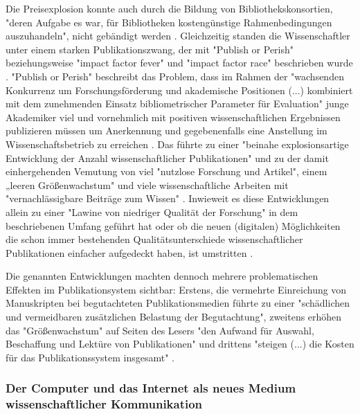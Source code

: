 Die Preisexplosion konnte auch durch die Bildung von Bibliothekskonsortien, "deren Aufgabe es war, für Bibliotheken kostengünstige Rahmenbedingungen auszuhandeln", nicht gebändigt werden \cite{Fladung_2003} \cite{Brintzinger_2010}. Gleichzeitig standen die Wissenschaftler unter einem starken Publikationszwang, der mit "Publish or Perish" \cite{CLAPHAM_2005} beziehungsweise "impact factor fever" \cite{Cherubini_2008} und "impact factor race" \cite{Brischoux_2009} beschrieben wurde \cite{offhaus_2012_institutionelle_repos}. "Publish or Perish" beschreibt das Problem, dass im Rahmen der "wachsenden Konkurrenz um Forschungsförderung und akademische Positionen (...) kombiniert mit dem zunehmenden Einsatz bibliometrischer Parameter für Evaluation" \cite{Fanelli_2010} junge Akademiker viel und vornehmlich mit positiven wissenschaftlichen Ergebnissen publizieren müssen um Anerkennung und gegebenenfalls eine Anstellung im Wissenschaftsbetrieb zu erreichen \cite{pscheida_2010_wikipedia} \cite{Beasley_2005} \cite{hamilton_1990_publishing}. Das führte zu einer "beinahe explosionsartige Entwicklung der Anzahl wissenschaftlicher Publikationen" \cite{bortz_Doering_2006_fragestellung} und zu der damit einhergehenden Vemutung von viel "nutzlose Forschung und Artikel"\cite{smith1990killing}, einem „leeren Größenwachstum" \cite{bbaw_publizieren_2015} und viele wissenschaftliche Arbeiten mit "vernachlässigbare Beiträge zum Wissen" \cite{hamilton_1990_publishing}. Inwieweit es diese Entwicklungen allein zu einer "Lawine von niedriger Qualität der Forschung" \cite{Bauerlein_2010} in dem beschriebenen Umfang geführt hat oder ob die neuen (digitalen) Möglichkeiten die schon immer bestehenden Qualitätsunterschiede wissenschaftlicher Publikationen einfacher aufgedeckt haben, ist umstritten \cite{rekdal_2014_academic}.

Die genannten Entwicklungen machten dennoch mehrere problematischen Effekten im Publikationsystem sichtbar: Erstens, die vermehrte Einreichung von Manuskripten bei begutachteten Publikationsmedien führte zu einer "schädlichen und vermeidbaren zusätzlichen Belastung der Begutachtung", zweitens erhöhen das "Größenwachstum" auf Seiten des Lesers "den Aufwand für Auswahl, Beschaffung und Lektüre von Publikationen" und drittens "steigen (...) die Kosten für das Publikationssystem insgesamt" \cite{bbaw_publizieren_2015}.

\subsubsection{Der Computer und das Internet als neues Medium wissenschaftlicher Kommunikation}

